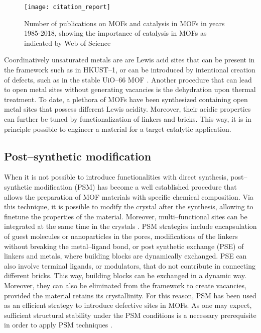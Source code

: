 \begin{figure}[!htbp]
	\centering
 	\texttt{[image: citation\_report]}
	\caption{Number of publications on MOFs and catalysis in MOFs in years 1985-2018, showing the importance of catalysis in MOFs as indicated by Web of Science}
	\label{fig:citation_report}
\end{figure}
\npar
Coordinatively unsaturated metals are are Lewis acid sites that can be present in the framework such as in HKUST--1\cite{chui1999chemically}, or can be introduced by intentional creation of defects, such as in the stable UiO--66 MOF \cite{vandichel2015active}. Another procedure that can lead to open metal sites without generating vacancies is the dehydration upon thermal treatment. To date, a plethora of MOFs have been synthesized containing open metal sites that possess different Lewis acidity. Moreover, their acidic properties can further be tuned by functionalization of linkers and bricks. This way, it is in principle possible to engineer a material for a target catalytic application.

\subsection*{Post--synthetic modification}
When it is not possible to introduce functionalities with direct synthesis, post--synthetic modification (PSM) \cite{wang2009postsynthetic, cohen2011postsynthetic} has become a well established procedure that allows the preparation of MOF materials with specific chemical composition. Via this technique, it is possible to modify the crystal after the synthesis, allowing to finetune the properties of the material. Moreover, multi--functional sites can be integrated at the same time in the crystals \cite{li2016applications}. PSM strategies include encapsulation of guest molecules or nanoparticles in the pores, modifications of the linkers without breaking the metal--ligand bond, or post synthetic exchange (PSE) of linkers and metals, where building blocks are dynamically exchanged. PSE can also involve terminal ligands, or modulators, that do not contribute in connecting different bricks. This way, building blocks can be exchanged in a dynamic way. Moreover, they can also be eliminated from the framework to create vacancies, provided the material retains its crystallinity. For this reason, PSM has been used as an efficient strategy to introduce defective sites in MOFs. As one may expect, sufficient structural stability under the PSM conditions is a necessary prerequisite in order to apply PSM techniques \cite{garibay2010isoreticular}.
%
